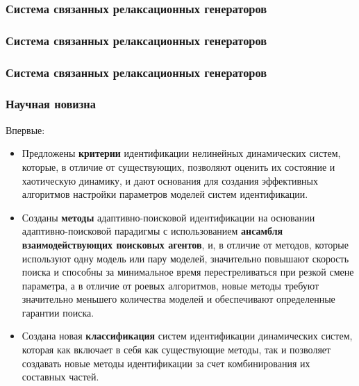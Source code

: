 \documentclass[10pt,utf8]{beamer}
\begin{document}

\begin{frame}
  \frametitle{Система связанных релаксационных генераторов}


\end{frame}




\begin{frame}
  \frametitle{Система связанных релаксационных генераторов}


\end{frame}




\begin{frame}
  \frametitle{Система связанных релаксационных генераторов}


\end{frame}




\begin{frame}
  \frametitle{Научная новизна}

  \noindent
  Впервые:

  \begin{itemize}

    \item
      Предложены \textbf{критерии} идентификации нелинейных динамических систем, которые, в
      отличие от существующих, позволяют оценить их состояние и хаотическую динамику,
      и дают основания для создания эффективных алгоритмов настройки параметров
      моделей систем идентификации.

    \item
      Созданы \textbf{методы} адаптивно-поисковой идентификации на основании
      адаптивно-поисковой парадигмы с использованием \textbf{ансамбля взаимодействующих поисковых агентов},
      и, в отличие от методов, которые
      используют одну модель или пару моделей, значительно повышают скорость поиска и
      способны за минимальное время перестреливаться при резкой смене параметра, а в
      отличие от роевых алгоритмов, новые методы требуют значительно меньшего
      количества моделей и обеспечивают определенные гарантии поиска.

    \item
      Создана новая \textbf{классификация} систем идентификации динамических систем, которая
      как включает в себя как существующие методы, так и позволяет создавать новые методы
      идентификации за счет комбинирования их составных частей.

  \end{itemize}


\end{frame}
\end{document}
